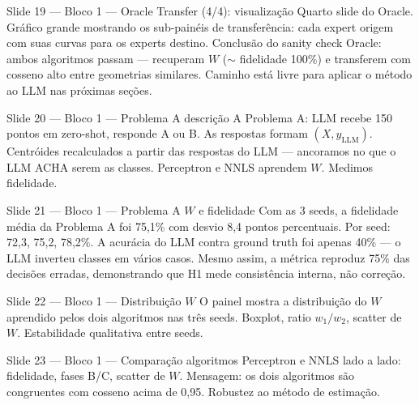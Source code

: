 \documentclass[aspectratio=169,10pt]{beamer}
\begin{document}
\begin{frame}{Slide 19 --- Bloco 1 --- Oracle Transfer (4/4): visualiza\c{c}\~ao}
\footnotesize
Quarto slide do Oracle. Gr\'afico grande mostrando os sub-pain\'eis de transfer\^encia: cada expert origem com suas curvas para os experts destino. Conclus\~ao do sanity check Oracle: ambos algoritmos passam --- recuperam $W$ ($\sim$ fidelidade 100\%) e transferem com cosseno alto entre geometrias similares. Caminho est\'a livre para aplicar o m\'etodo ao LLM nas pr\'oximas se\c{c}\~oes.
\end{frame}

\begin{frame}{Slide 20 --- Bloco 1 --- Problema A descri\c{c}\~ao}
\footnotesize
A Problema A: LLM recebe 150 pontos em zero-shot, responde A ou B. As respostas formam $(X, y_{\text{LLM}})$. Centr\'oides recalculados a partir das respostas do LLM --- ancoramos no que o LLM ACHA serem as classes. Perceptron e NNLS aprendem $W$. Medimos fidelidade.
\end{frame}

\begin{frame}{Slide 21 --- Bloco 1 --- Problema A $W$ e fidelidade}
\footnotesize
Com as 3 seeds, a fidelidade m\'edia da Problema A foi 75{,}1\% com desvio 8{,}4 pontos percentuais. Por seed: 72{,}3, 75{,}2, 78{,}2\%. A acur\'acia do LLM contra ground truth foi apenas 40\% --- o LLM inverteu classes em v\'arios casos. Mesmo assim, a m\'etrica reproduz 75\% das decis\~oes erradas, demonstrando que H1 mede consist\^encia interna, n\~ao corre\c{c}\~ao.
\end{frame}

\begin{frame}{Slide 22 --- Bloco 1 --- Distribui\c{c}\~ao $W$}
\footnotesize
O painel mostra a distribui\c{c}\~ao do $W$ aprendido pelos dois algoritmos nas tr\^es seeds. Boxplot, ratio $w_1/w_2$, scatter de $W$. Estabilidade qualitativa entre seeds.
\end{frame}

\begin{frame}{Slide 23 --- Bloco 1 --- Compara\c{c}\~ao algoritmos}
\footnotesize
Perceptron e NNLS lado a lado: fidelidade, fases B/C, scatter de $W$. Mensagem: os dois algoritmos s\~ao congruentes com cosseno acima de 0{,}95. Robustez ao m\'etodo de estima\c{c}\~ao.
\end{frame}
\end{document}
